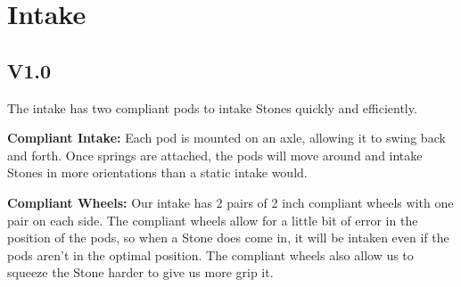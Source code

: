 
\section{Intake}
\subsection{V1.0}
The intake has two compliant pods to intake Stones quickly and efficiently.
\par \textbf{Compliant Intake:} Each pod is mounted on an axle, allowing it to swing back and forth. Once springs are attached, the pods will move around and intake Stones in more orientations than a static intake would.

\par \textbf{Compliant Wheels:} Our intake has 2 pairs of 2 inch compliant wheels with one pair on each side. The compliant wheels allow for a little bit of error in the position of the pods, so when a Stone does come in, it will be intaken even if the pods aren't in the optimal position. The compliant wheels also allow us to squeeze the Stone harder to give us more grip it.


